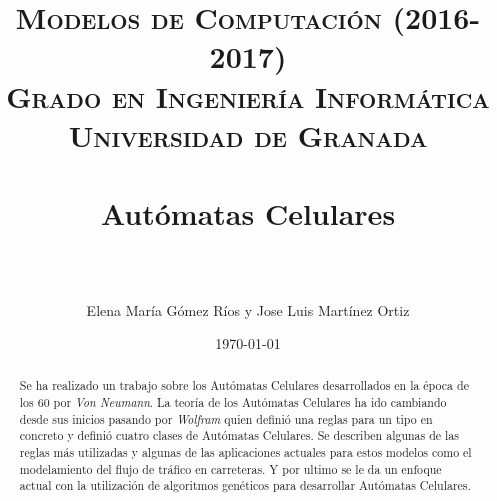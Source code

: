 


\title{	
\normalfont \normalsize 
\textsc{\textbf{Modelos de Computación (2016-2017)} \\ Grado en Ingeniería Informática \\ Universidad de Granada} \\ [25pt] %
\horrule{0.5pt} \\[0.4cm] %
\huge Autómatas Celulares \\ %
\horrule{2pt} \\[0.5cm] %
\author{Elena María Gómez Ríos y Jose Luis Martínez Ortiz}
}

\date{\normalsize\today} %




\maketitle %

\newpage

\begin{abstract} 
Se ha realizado un trabajo sobre los Autómatas Celulares desarrollados en la época de los 60 por \textit{Von Neumann}. La teoría de los Autómatas Celulares ha ido cambiando desde sus inicios pasando por \textit{Wolfram} quien definió una reglas para un tipo en concreto y definió cuatro clases de Autómatas Celulares. Se describen algunas de las reglas más utilizadas y algunas de las aplicaciones actuales para estos modelos como el modelamiento del flujo de tráfico en carreteras. Y por ultimo se le da un enfoque actual con la utilización de algoritmos genéticos para desarrollar Autómatas Celulares.


\end{abstract}

